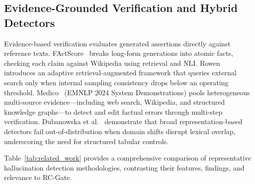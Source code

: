 \documentclass[pdflatex,sn-mathphys,Numbered]{sn-jnl}
\begin{document}
\subsection{Evidence-Grounded Verification and Hybrid Detectors}
Evidence-based verification evaluates generated assertions directly against reference texts. FActScore~\cite{min2023factscore} breaks long-form generations into atomic facts, checking each claim against Wikipedia using retrieval and NLI. Rowen~\cite{ding2024rowen} introduces an adaptive retrieval-augmented framework that queries external search only when internal sampling consistency drops below an operating threshold. Medico~\cite{zhao2024medico} (EMNLP 2024 System Demonstrations) pools heterogeneous multi-source evidence---including web search, Wikipedia, and structured knowledge graphs---to detect and edit factual errors through multi-step verification. Dubanowska et al.~\cite{dubanowska2025ood} demonstrate that broad representation-based detectors fail out-of-distribution when domain shifts disrupt lexical overlap, underscoring the need for structured tabular controls.

Table~\ref{tab:related_work} provides a comprehensive comparison of representative hallucination detection methodologies, contrasting their features, findings, and relevance to RC-Gate.
\end{document}
